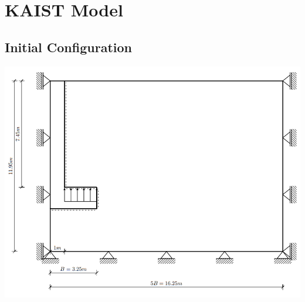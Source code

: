\documentclass[a4paper, nobind]{templates/ociamthesis}
\begin{document}
\hypertarget{kaist-model}{%
\chapter{KAIST Model}\label{kaist-model}}

\hypertarget{initial-configuration}{%
\section{Initial Configuration}\label{initial-configuration}}

\includegraphics[width=1\linewidth]{myfigureeeeee/boundary}
\end{document}
